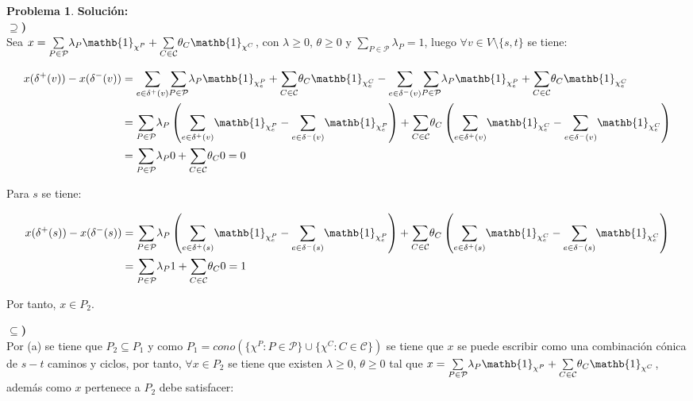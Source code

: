 \documentclass{article}
\theoremstyle{plain}
\theoremstyle{definition}
\newtheorem{prob}[teo]{Problema}
\theoremstyle{Azul}
\begin{document}
\begin{prob}
\textbf{Solución:}\\


\textbf{$\supseteq$)}\\

Sea $x=\underset{P \in \mathcal{P}}{\sum}\lambda_{P}\mathb{1}_{\chi^{P}}+\underset{C \in \mathcal{C}}{\sum}\theta_{C}\mathb{1}_{\chi^{C}}$, con $\lambda\geq0$, $\theta\geq0$ y $\underset{P\in\mathcal{P}}{\sum}\lambda_{P}=1$, luego $\forall v \in V\setminus\{s,t\}$ se tiene:

\begin{align*}
	x(\delta^{+}(v))-x(\delta^{-}(v)) &=\underset{e\in\delta^{+}(v)}{\sum}\underset{P \in \mathcal{P}}{\sum}\lambda_{P}\mathb{1}_{\chi^{P}_{e}}+\underset{C \in \mathcal{C}}{\sum}\theta_{C}\mathb{1}_{\chi^{C}_{e}}-\underset{e\in\delta^{-}(v)}{\sum}\underset{P \in \mathcal{P}}{\sum}\lambda_{P}\mathb{1}_{\chi^{P}_{e}}+\underset{C \in \mathcal{C}}{\sum}\theta_{C}\mathb{1}_{\chi^{C}_{e}}\\
	&=\underset{P \in \mathcal{P}}{\sum}\lambda_{P}\left(\underset{e\in\delta^{+}(v)}{\sum}\mathb{1}_{\chi^{P}_{e}}-\underset{e\in\delta^{-}(v)}{\sum}\mathb{1}_{\chi^{P}_{e}}\right)+\underset{C \in \mathcal{C}}{\sum}\theta_{C}\left(\underset{e\in\delta^{+}(v)}{\sum}\mathb{1}_{\chi^{C}_{e}}-\underset{e\in\delta^{-}(v)}{\sum}\mathb{1}_{\chi^{C}_{e}}\right)\\
	&=\underset{P \in \mathcal{P}}{\sum}\lambda_{P}0+\underset{C \in \mathcal{C}}{\sum}\theta_{C}0=0\\
\end{align*}

Para $s$ se tiene:

\begin{align*}
	x(\delta^{+}(s))-x(\delta^{-}(s)) &=\underset{P \in \mathcal{P}}{\sum}\lambda_{P}\left(\underset{e\in\delta^{+}(s)}{\sum}\mathb{1}_{\chi^{P}_{e}}-\underset{e\in\delta^{-}(s)}{\sum}\mathb{1}_{\chi^{P}_{e}}\right)+\underset{C \in \mathcal{C}}{\sum}\theta_{C}\left(\underset{e\in\delta^{+}(s)}{\sum}\mathb{1}_{\chi^{C}_{e}}-\underset{e\in\delta^{-}(s)}{\sum}\mathb{1}_{\chi^{C}_{e}}\right)\\
	&=\underset{P \in \mathcal{P}}{\sum}\lambda_{P}1+\underset{C \in \mathcal{C}}{\sum}\theta_{C}0=1\\
\end{align*}

Por tanto, $x\in P_{2}$.

\textbf{$\subseteq$)}\\

Por (a) se tiene que $P_{2}\subseteq P_{1}$ y como $P_{1}=cono(\{\chi^P\colon P\in \mathcal{P}\}\cup \{\chi^C\colon C\in \mathcal{C}\})$ se tiene que $x$ se puede escribir como una combinación cónica de $s-t$ caminos y ciclos, por tanto,  $\forall x\in P_{2}$ se tiene que existen $\lambda\geq0$, $\theta\geq0$ tal que $x=\underset{P \in \mathcal{P}}{\sum}\lambda_{P}\mathb{1}_{\chi^{P}}+\underset{C \in \mathcal{C}}{\sum}\theta_{C}\mathb{1}_{\chi^{C}}$, además como $x$ pertenece a $P_{2}$ debe satisfacer:


\end{prob}
\end{document}
